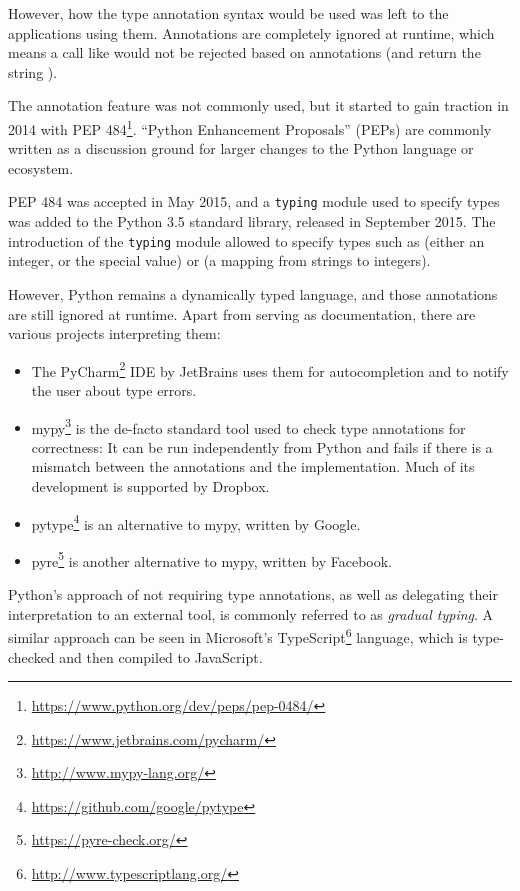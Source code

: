 However, how the type annotation syntax would be used was left to the
applications using them. Annotations are completely ignored at runtime, which
means a call like  would not be rejected based on annotations
(and return the string ).

The annotation feature was not commonly used, but it started to gain traction
in 2014 with PEP 484\footnote{\url{https://www.python.org/dev/peps/pep-0484/}}.
``Python Enhancement Proposals'' (PEPs) are commonly written as a discussion
ground for larger changes to the Python language or ecosystem.

PEP 484 was accepted in May 2015, and a \verb|typing| module used to specify types
was added to the Python 3.5 standard library, released in September 2015. The
introduction of the \verb|typing| module allowed to specify types such as
 (either an integer, or the special  value) or
 (a mapping from strings to integers).

However, Python remains a dynamically typed language, and those annotations are
still ignored at runtime. Apart from serving as documentation, there are various
projects interpreting them:

\label{typecheck-tools}
\begin{itemize}
  \item The PyCharm\footnote{\url{https://www.jetbrains.com/pycharm/}} IDE by
    JetBrains uses them for autocompletion and to notify the user about type
    errors.
  \item mypy\footnote{\url{http://www.mypy-lang.org/}} is the de-facto standard
    tool used to check type annotations for correctness: It can be run
    independently from Python and fails if there is a mismatch between the
    annotations and the implementation. Much of its development is supported by
    Dropbox.
  \item pytype\footnote{\url{https://github.com/google/pytype}} is an
    alternative to mypy, written by Google.
  \item pyre\footnote{\url{https://pyre-check.org/}} is another alternative
    to mypy, written by Facebook.
\end{itemize}

Python's approach of not requiring type annotations, as well as delegating their
interpretation to an external tool, is commonly referred to as
\emph{gradual typing}. A similar approach can be seen in Microsoft's
TypeScript\footnote{\url{http://www.typescriptlang.org/}} language, which is
type-checked and then compiled to JavaScript.

